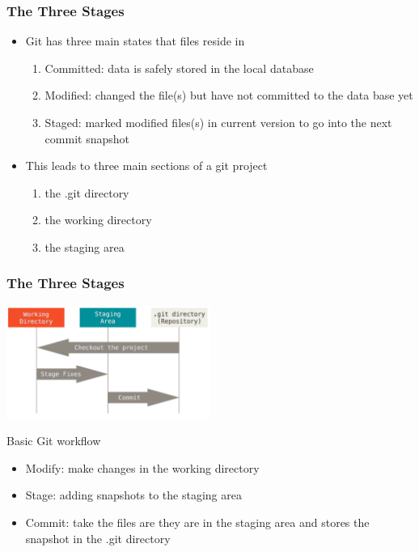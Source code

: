 \begin{frame}
  \frametitle{The Three Stages}
  \begin{itemize}
    \item Git has three main states that files reside in
      \begin{enumerate}
        \item Committed: data is safely stored in the local database
        \item Modified: changed the file(s) but have not committed to the
          data base yet
        \item Staged: marked modified files(s) in current version to go into the
          next commit snapshot
      \end{enumerate}
    \item This leads to three main sections of a git project
      \begin{enumerate}
        \item the .git directory
        \item the working directory
        \item the staging area
      \end{enumerate}
  \end{itemize}
\end{frame}

\begin{frame}
  \frametitle{The Three Stages}
  \begin{center}
  \includegraphics[width=0.5\textwidth]{areas}
  \end{center}

  Basic Git workflow
  \begin{itemize}
    \item Modify: make changes in the working directory
    \item Stage: adding snapshots to the staging area
    \item Commit: take the files are they are in the staging area and stores the
      snapshot in the .git directory
  \end{itemize}
\end{frame}
